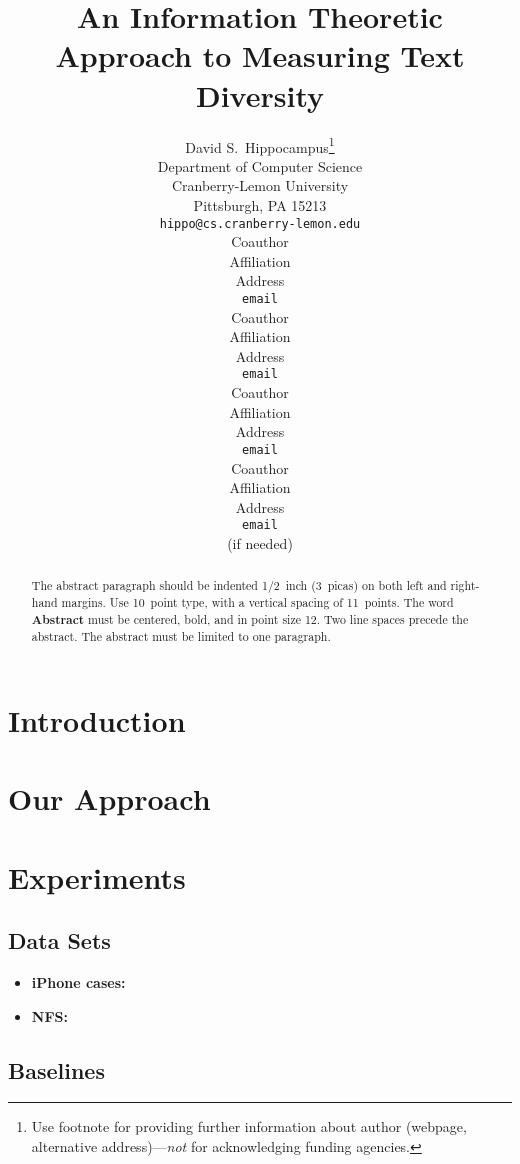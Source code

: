 \documentclass{article} %
\title{An Information Theoretic Approach to Measuring Text Diversity}
\author{
David S.~Hippocampus\thanks{ Use footnote for providing further information
about author (webpage, alternative address)---\emph{not} for acknowledging
funding agencies.} \\
Department of Computer Science\\
Cranberry-Lemon University\\
Pittsburgh, PA 15213 \\
\texttt{hippo@cs.cranberry-lemon.edu} \\
\And
Coauthor \\
Affiliation \\
Address \\
\texttt{email} \\
\AND
Coauthor \\
Affiliation \\
Address \\
\texttt{email} \\
\And
Coauthor \\
Affiliation \\
Address \\
\texttt{email} \\
\And
Coauthor \\
Affiliation \\
Address \\
\texttt{email} \\
(if needed)\\
}
\begin{document}
\maketitle

\begin{abstract}
The abstract paragraph should be indented 1/2~inch (3~picas) on both left and
right-hand margins. Use 10~point type, with a vertical spacing of 11~points.
The word \textbf{Abstract} must be centered, bold, and in point size 12. Two
line spaces precede the abstract. The abstract must be limited to one
paragraph.
\end{abstract}



\section{Introduction}
\label{sec:introduction}


\section{Our Approach}
\label{sec:our-approach}



\section{Experiments}
\label{sec:experiments}

\subsection{Data Sets}
\label{sec:data-sets}
\begin{itemize}
\item {\bf iPhone cases:}
\item{\bf NFS:}
\end{itemize}

\subsection{Baselines}
\label{sec:baselines}
\end{document}
